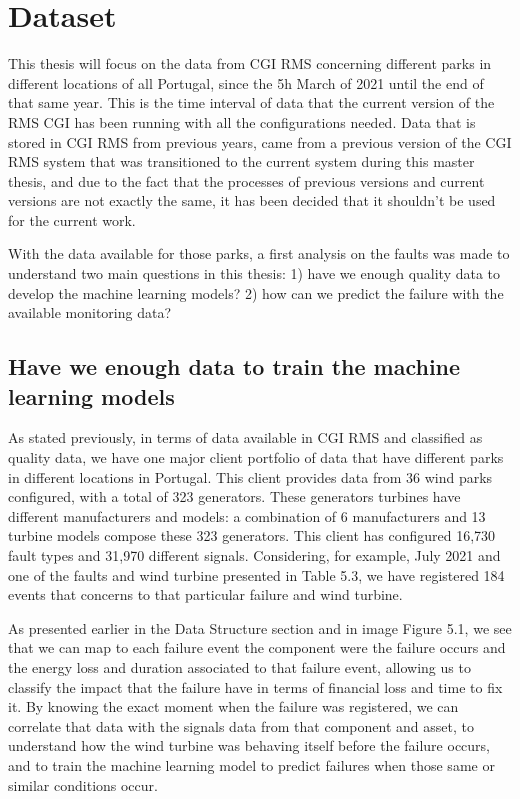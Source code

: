 \section{Dataset}
\label{sub:if_you_use_this_template} 
This thesis will focus on the data from CGI RMS concerning different parks in different locations of all Portugal, since the 5h March of 2021 until the end of that same year. This is the time interval of data that the current version of the RMS CGI has been running with all the configurations needed. Data that is stored in CGI RMS from previous years, came from a previous version of the CGI RMS system that was transitioned to the current system during this master thesis, and due to the fact that the processes of previous versions and current versions are not exactly the same, it has been decided that it shouldn't be used for the current work.

With the data available for those parks, a first analysis on the faults was made to understand two main questions in this thesis: 1) have we enough quality data to develop the machine learning models? 2) how can we predict the failure with the available monitoring data? 

\subsection{Have we enough data to train the machine learning models} 
\label{sub:if_you_use_this_template} 

As stated previously, in terms of data available in CGI RMS and classified as quality data, we have one major client portfolio of data that have different parks in different locations in Portugal. This client provides data from 36 wind parks configured, with a total of 323 generators. These generators turbines have different manufacturers and models: a combination of 6 manufacturers and 13 turbine models compose these 323 generators. This client has configured 16,730 fault types and 31,970 different signals.
Considering, for example, July 2021 and one of the faults and wind turbine presented in Table 5.3, we have registered 184 events that concerns to that particular failure and wind turbine.

As presented earlier in the Data Structure section and in image Figure 5.1, we see that we can map to each failure event the component were the failure occurs and the energy loss and duration associated to that failure event, allowing us to classify the impact that the failure have in terms of financial loss and time to fix it. By knowing the exact moment when the failure was registered, we can correlate that data with the signals data from that component and asset, to understand how the wind turbine was behaving itself before the failure occurs, and to train the machine learning model to predict failures when those same or similar conditions occur.

